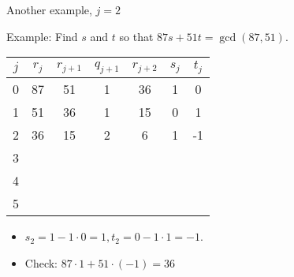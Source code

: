 \documentclass[handout]{beamer}
\begin{document}
\begin{frame}{Another example, $j=2$}

Example: Find $s$ and $t$ so that $87s+51t = \gcd(87, 51)$.

\vspace{1em}

\begin{tabular}{|c|c|c|c|c|c|c|}\hline
$j$   &  $r_{j}$    & $r_{j+1}$ & $q_{j+1}$ & $r_{j+2}$ & $s_j$ & $t_j$ \\ \hline\hline
0     &  87         &  51       &    1      &   36      &  1    &   0   \\ \hline
1     &  51         &  36       &    1      &   15      &  0    &   1   \\ \hline
2     &  36         &  15       &    2      &    6      &  1    &  -1   \\ \hline
3     &             &           &           &           &       &       \\ \hline
4     &             &           &           &           &       &       \\ \hline
5     &             &           &           &           &       &       \\ \hline
\end{tabular}

\vspace{1em}

\begin{itemize}
  \item $s_2 = 1 - 1\cdot 0 = 1, t_2 = 0 - 1\cdot 1 = -1$.
  \item Check: $87\cdot 1 + 51\cdot (-1) = 36$
\end{itemize}

\end{frame}
\end{document}
